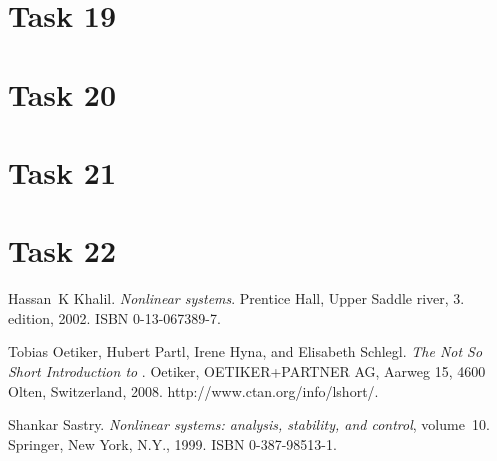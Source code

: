 \documentclass[a4paper,12pt,oneside,onecolumn]{article} %
\begin{document}
\section*{Task 19}
%

\section*{Task 20}
%

\section*{Task 21}
%

\section*{Task 22}
%




\begin{thebibliography}{99}
Hassan~K Khalil.
\newblock \emph{Nonlinear systems}.
\newblock Prentice Hall, Upper Saddle river, 3. edition, 2002.
\newblock ISBN 0-13-067389-7.

Tobias Oetiker, Hubert Partl, Irene Hyna, and Elisabeth Schlegl.
\newblock \emph{The Not So Short Introduction to \LaTeXe}.
\newblock Oetiker, OETIKER+PARTNER AG, Aarweg 15, 4600 Olten, Switzerland,
  2008.
\newblock http://www.ctan.org/info/lshort/.

Shankar Sastry.
\newblock \emph{Nonlinear systems: analysis, stability, and control},
  volume~10.
\newblock Springer, New York, N.Y., 1999.
\newblock ISBN 0-387-98513-1.
\end{thebibliography}
\end{document}
